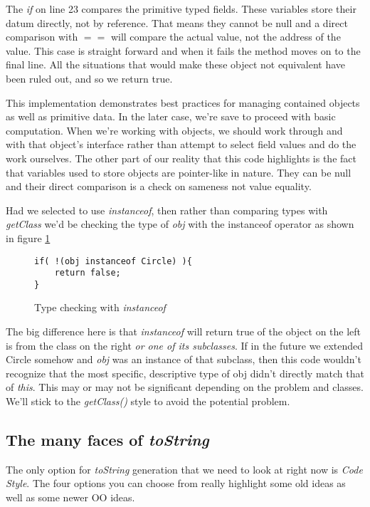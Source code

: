 \documentclass[nobib]{tufte-handout}
\begin{document}
The \textit{if} on line 23 compares the primitive typed fields. These variables store their datum directly, not by reference. That means they cannot be null and a direct comparison with $==$ will compare the actual value, not the address of the value. This case is straight forward and when it fails the method moves on to the final line. All the situations that would make these object not equivalent have been ruled out, and so we return true.

This implementation demonstrates best practices for managing contained objects as well as primitive data. In the later case, we're save to proceed with basic computation. When we're working with objects, we should work through and with that object's interface rather than attempt to select field values and do the work ourselves. The other part of our reality that this code highlights is the fact that variables used to store objects are pointer-like in nature. They can be null and their direct comparison is a check on sameness not value equality.

Had we selected to use \textit{instanceof}, then rather than comparing types with \textit{getClass} we'd be checking the type of \textit{obj} with the instanceof operator as shown in figure \ref{fig:instanceof}
\begin{figure}
\begin{lstlisting}
if( !(obj instanceof Circle) ){
	return false;
}
\end{lstlisting}
\label{fig:instanceof}
\caption{Type checking with \textit{instanceof}}
\end{figure}
The big difference here is that \textit{instanceof} will return true of the object on the left is from the class on the right \textit{or one of its subclasses}. If in the future we extended Circle somehow and \textit{obj} was an instance of that subclass, then this code wouldn't recognize that the most specific, descriptive type of obj didn't directly match that of \textit{this}. This may or may not be significant depending on the problem and classes. We'll stick to the \textit{getClass()} style to avoid the potential problem.

\subsection*{The many faces of \textit{toString}}

The only option for \textit{toString} generation that we need to look at right now is \textit{Code Style}. The four options you can choose from really highlight some old ideas as well as some newer OO ideas.
\end{document}
